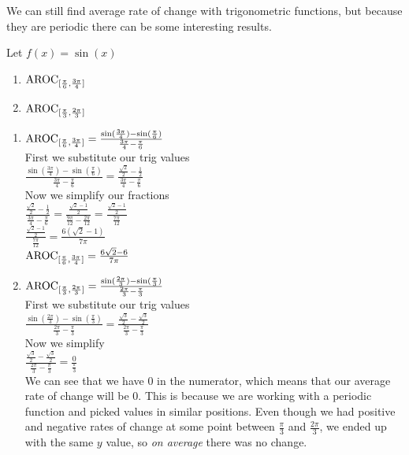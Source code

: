 \documentclass{ximera}
\begin{document}
We can still find average rate of change with trigonometric functions, but because they are periodic there can be some interesting results.

\begin{example}
Let $f(x) =\sin(x)$
\begin{enumerate}
\item $\mathrm{AROC}_{[\frac{\pi}{6},\frac{3\pi}{4}]} $
\item $\mathrm{AROC}_{[\frac{\pi}{3},\frac{2\pi}{3}]} $
\end{enumerate}
\begin{explanation}
\begin{enumerate}
\item $\mathrm{AROC}_{[\frac{\pi}{6},\frac{3\pi}{4}]}  = \frac{\sin(\frac{3\pi}{4})-\sin(\frac{\pi}{6})}{\frac{3\pi}{4} - \frac{\pi}{6}}$\\
First we substitute our trig values\\
$\frac{\sin(\frac{3\pi}{4})-\sin(\frac{\pi}{6})}{\frac{3\pi}{4} - \frac{\pi}{6}}=\frac{\frac{\sqrt{2}}{2}-\frac{1}{2}}{\frac{3\pi}{4} - \frac{\pi}{6}}$\\
Now we simplify our fractions\\
$\frac{\frac{\sqrt{2}}{2}-\frac{1}{2}}{\frac{3\pi}{4} - \frac{\pi}{6}}= \frac{\frac{\sqrt{2}-1}{2}}{\frac{9\pi}{12} - \frac{2\pi}{12}}= \frac{\frac{\sqrt{2}-1}{2}}{\frac{7\pi}{12}}$\\
$\frac{\frac{\sqrt{2}-1}{2}}{\frac{7\pi}{12}}=\frac{6(\sqrt{2}-1)}{7\pi}$\\
$\mathrm{AROC}_{[\frac{\pi}{6},\frac{3\pi}{4}]} =\frac{6\sqrt{2}-6}{7\pi}$

\item $\mathrm{AROC}_{[\frac{\pi}{3},\frac{2\pi}{3}]} = \frac{\sin(\frac{2\pi}{3})-\sin(\frac{\pi}{3})}{\frac{2\pi}{3} - \frac{\pi}{3}}$\\
First we substitute our trig values\\
$\frac{\sin(\frac{2\pi}{3})-\sin(\frac{\pi}{3})}{\frac{2\pi}{3} - \frac{\pi}{3}} = \frac{\frac{\sqrt{3}}{2}-\frac{\sqrt{3}}{2}}{\frac{2\pi}{3} - \frac{\pi}{3}}$\\
Now we simplify\\
$\frac{\frac{\sqrt{3}}{2}-\frac{\sqrt{3}}{2}}{\frac{2\pi}{3} - \frac{\pi}{3}}=\frac{0}{\frac{\pi}{3}}$\\
We can see that we have $0$ in the numerator, which means that our average rate of change will be $0$. This is because we are working with a periodic function and picked values in similar positions. Even though we had positive and negative rates of change at some point between $\frac{\pi}{3}$ and $\frac{2\pi}{3}$, we ended up with the same $y$ value, so \textit{on average} there was no change.
\end{enumerate}
\end{explanation}
\end{example}
\end{document}
